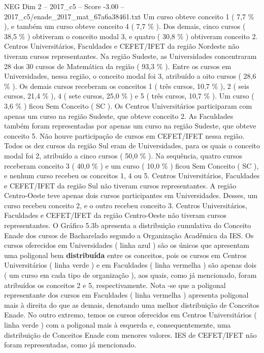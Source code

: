 \begin{textsample}{NEG Dim 2 – 2017\_c5 – Score -3.00 – 2017\_c5/enade\_2017\_mat\_67a6a38461.txt}
Um curso obteve conceito 1 ( 7,7 \% ), e também um curso obteve conceito 4 ( 7,7 \% ).
Dos demais, cinco cursos ( 38,5 \% ) obtiveram o conceito modal 3, e quatro ( 30,8 \% ) obtiveram conceito 2.
Centros Universitários, Faculdades e CEFET/IFET da região Nordeste não tiveram cursos representantes.
Na região Sudeste, as Universidades concentraram 28 dos 30 cursos de Matemática da região ( 93,3 \% ).
Entre os cursos em Universidades, nessa região, o conceito modal foi 3, atribuído a oito cursos ( 28,6 \% ).
Os demais cursos receberam os conceitos 1 ( três cursos, 10,7 \% ), 2 ( seis cursos, 21,4 \% ), 4 ( sete cursos, 25,0 \% ) e 5 ( três cursos, 10,7 \% ).
Um curso ( 3,6 \% ) ficou Sem Conceito ( SC ).
Os Centros Universitários participaram com apenas um curso na região Sudeste, que obteve conceito 2.
As Faculdades também foram representadas por apenas um curso na região Sudeste, que obteve conceito 5.
Não houve participação de cursos em CEFET/IFET nessa região.
Todos os dez cursos da região Sul eram de Universidades, para os quais o conceito modal foi 2, atribuído a cinco cursos ( 50,0 \% ).
Na sequência, quatro cursos receberam conceito 3 ( 40,0 \% ) e um curso ( 10,0 \% ) ficou Sem Conceito ( SC ), e nenhum curso recebeu os conceitos 1, 4 ou 5.
Centros Universitários, Faculdades e CEFET/IFET da região Sul não tiveram cursos representantes.
A região Centro-Oeste teve apenas dois cursos participantes em Universidades.
Desses, um curso recebeu conceito 2, e o outro recebeu conceito 3.
Centros Universitários, Faculdades e CEFET/IFET da região Centro-Oeste não tiveram cursos representantes.
O Gráfico 5.3b apresenta a distribuição cumulativa do Conceito Enade dos cursos de Bacharelado segundo a Organização Acadêmica da IES.
Os cursos oferecidos em Universidades ( linha azul ) são os únicos que apresentam uma poligonal bem \textbf{distribuída} entre os conceitos, pois os cursos em Centros Universitários ( linha verde ) e em Faculdades ( linha vermelha ) são apenas dois ( um curso em cada tipo de organização ), aos quais, como já mencionado, foram atribuídos os conceitos 2 e 5, respectivamente.
Nota -se que a poligonal representante dos cursos em Faculdades ( linha vermelha ) apresenta poligonal mais à direita do que as demais, denotando uma melhor distribuição de Conceitos Enade.
No outro extremo, temos os cursos oferecidos em Centros Universitários ( linha verde ) com a poligonal mais à esquerda e, consequentemente, uma distribuição de Conceitos Enade com menores valores.
IES de CEFET/IFET não foram representadas, como já mencionado.

\end{textsample}
